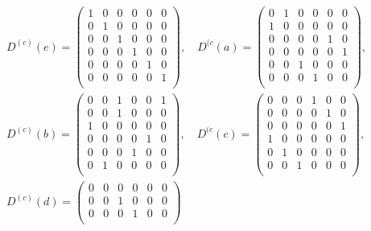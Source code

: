 \documentclass[UTF8]{ctexart}
\begin{document}
\begin{gather}
  D^{(c)}(e) =
  \begin{pmatrix}
    1 & 0 & 0 & 0 & 0 & 0 \\
    0 & 1 & 0 & 0 & 0 & 0 \\
    0 & 0 & 1 & 0 & 0 & 0 \\
    0 & 0 & 0 & 1 & 0 & 0 \\
    0 & 0 & 0 & 0 & 1 & 0 \\
    0 & 0 & 0 & 0 & 0 & 1 \\
  \end{pmatrix}, \quad
  D^{(c}(a) =
  \begin{pmatrix}
    0 & 1 & 0 & 0 & 0 & 0 \\
    1 & 0 & 0 & 0 & 0 & 0 \\
    0 & 0 & 0 & 0 & 1 & 0 \\
    0 & 0 & 0 & 0 & 0 & 1 \\
    0 & 0 & 1 & 0 & 0 & 0 \\
    0 & 0 & 0 & 1 & 0 & 0 \\
  \end{pmatrix}, \\
  D^{(c)}(b) =
  \begin{pmatrix}
    0 & 0 & 1 & 0 & 0 & 1 \\
    0 & 0 & 1 & 0 & 0 & 0 \\
    1 & 0 & 0 & 0 & 0 & 0 \\
    0 & 0 & 0 & 0 & 1 & 0 \\
    0 & 0 & 0 & 1 & 0 & 0 \\
    0 & 1 & 0 & 0 & 0 & 0 \\
  \end{pmatrix}, \quad
  D^{(c}(c) =
  \begin{pmatrix}
    0 & 0 & 0 & 1 & 0 & 0 \\
    0 & 0 & 0 & 0 & 1 & 0 \\
    0 & 0 & 0 & 0 & 0 & 1 \\
    1 & 0 & 0 & 0 & 0 & 0 \\
    0 & 1 & 0 & 0 & 0 & 0 \\
    0 & 0 & 1 & 0 & 0 & 0 \\
  \end{pmatrix}, \\
  D^{(c)}(d) =
  \begin{pmatrix}
    0 & 0 & 0 & 0 & 0 & 0 \\
    0 & 0 & 1 & 0 & 0 & 0 \\
    0 & 0 & 0 & 1 & 0 & 0 \\

\end{pmatrix}
\end{gather}
\end{document}
